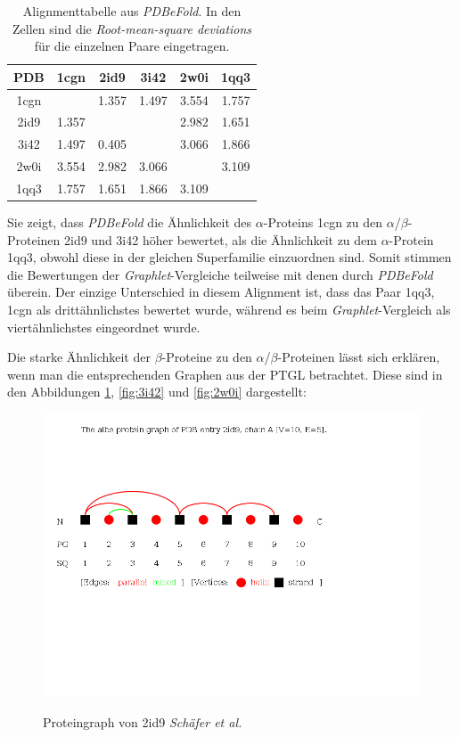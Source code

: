 \documentclass{report}
\begin{document}
\begin{table}
\begin{tabular}{ | c | c | c | c | c | c | }
\hline
PDB & 1cgn    & 2id9  & 3i42  & 2w0i  & 1qq3 \\ \hline
1cgn &        & 1.357 & 1.497 & 3.554 & 1.757 \\ \hline
2id9 & 1.357  &       &       & 2.982 & 1.651 \\ \hline
3i42 &  1.497 & 0.405 &       & 3.066 & 1.866 \\ \hline
2w0i & 3.554  & 2.982 & 3.066 &       & 3.109  \\ \hline
1qq3 & 1.757  & 1.651 & 1.866 & 3.109 &       \\ \hline
\end{tabular}
\label{table:efold-comp1}
\caption{Alignmenttabelle aus  \textit{PDBeFold}. In den Zellen sind die \textit{Root-mean-square deviations} f\"ur die einzelnen Paare eingetragen.}
\end{table}


Sie zeigt, dass \textit{PDBeFold} die \"Ahnlichkeit des $\alpha$-Proteins 1cgn zu den $\alpha$/$\beta$-Proteinen 2id9 und 3i42 h\"oher bewertet, als die \"Ahnlichkeit zu dem $\alpha$-Protein 1qq3, obwohl diese in der gleichen Superfamilie einzuordnen sind. Somit stimmen die Bewertungen der \textit{Graphlet}-Vergleiche teilweise mit denen durch \textit{PDBeFold} \"uberein. Der einzige Unterschied in diesem Alignment ist, dass das Paar 1qq3, 1cgn als dritt\"ahnlichstes bewertet wurde, w\"ahrend es beim \textit{Graphlet}-Vergleich als viert\"ahnlichstes eingeordnet wurde.


Die starke \"Ahnlichkeit der $\beta$-Proteine zu den $\alpha$/$\beta$-Proteinen l\"asst sich erkl\"aren, wenn man die entsprechenden Graphen aus der PTGL betrachtet. Diese sind in den Abbildungen \ref{fig:2id9}, \ref{fig:3i42} und \ref{fig:2w0i} dargestellt:

\begin{figure}
\includegraphics[scale=0.5]{2id9_A_albe_PG.png}
\label{fig:2id9}
\caption{Proteingraph von 2id9 \textit{Sch\"afer et al.}}
\end{figure}
\end{document}
